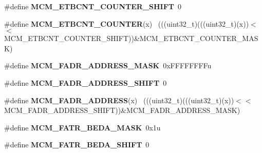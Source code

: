 \begin{DoxyCompactItemize}
\item 
\hypertarget{group___m_c_m___register___masks_ga6f3bfee5c1a266db914bfcce1b33e40f}{}\#define {\bfseries M\+C\+M\+\_\+\+E\+T\+B\+C\+N\+T\+\_\+\+C\+O\+U\+N\+T\+E\+R\+\_\+\+S\+H\+I\+F\+T}~0\label{group___m_c_m___register___masks_ga6f3bfee5c1a266db914bfcce1b33e40f}

\item 
\hypertarget{group___m_c_m___register___masks_ga39cc90d272fd862daffa4e7dd56ea620}{}\#define {\bfseries M\+C\+M\+\_\+\+E\+T\+B\+C\+N\+T\+\_\+\+C\+O\+U\+N\+T\+E\+R}(x)                                    ~(((uint32\+\_\+t)(((uint32\+\_\+t)(x))$<$$<$M\+C\+M\+\_\+\+E\+T\+B\+C\+N\+T\+\_\+\+C\+O\+U\+N\+T\+E\+R\+\_\+\+S\+H\+I\+F\+T))\&M\+C\+M\+\_\+\+E\+T\+B\+C\+N\+T\+\_\+\+C\+O\+U\+N\+T\+E\+R\+\_\+\+M\+A\+S\+K)\label{group___m_c_m___register___masks_ga39cc90d272fd862daffa4e7dd56ea620}

\item 
\hypertarget{group___m_c_m___register___masks_ga4d38b5dbbcf334e28e2c3201c8e658e2}{}\#define {\bfseries M\+C\+M\+\_\+\+F\+A\+D\+R\+\_\+\+A\+D\+D\+R\+E\+S\+S\+\_\+\+M\+A\+S\+K}~0x\+F\+F\+F\+F\+F\+F\+F\+Fu\label{group___m_c_m___register___masks_ga4d38b5dbbcf334e28e2c3201c8e658e2}

\item 
\hypertarget{group___m_c_m___register___masks_ga2c28100f868982fa4c5f783b8031664b}{}\#define {\bfseries M\+C\+M\+\_\+\+F\+A\+D\+R\+\_\+\+A\+D\+D\+R\+E\+S\+S\+\_\+\+S\+H\+I\+F\+T}~0\label{group___m_c_m___register___masks_ga2c28100f868982fa4c5f783b8031664b}

\item 
\hypertarget{group___m_c_m___register___masks_gaf25e8d81d4a025faf9b89e76a310225a}{}\#define {\bfseries M\+C\+M\+\_\+\+F\+A\+D\+R\+\_\+\+A\+D\+D\+R\+E\+S\+S}(x)                                        ~(((uint32\+\_\+t)(((uint32\+\_\+t)(x))$<$$<$M\+C\+M\+\_\+\+F\+A\+D\+R\+\_\+\+A\+D\+D\+R\+E\+S\+S\+\_\+\+S\+H\+I\+F\+T))\&M\+C\+M\+\_\+\+F\+A\+D\+R\+\_\+\+A\+D\+D\+R\+E\+S\+S\+\_\+\+M\+A\+S\+K)\label{group___m_c_m___register___masks_gaf25e8d81d4a025faf9b89e76a310225a}

\item 
\hypertarget{group___m_c_m___register___masks_ga272bbb2c15046aad60249952d201ebfc}{}\#define {\bfseries M\+C\+M\+\_\+\+F\+A\+T\+R\+\_\+\+B\+E\+D\+A\+\_\+\+M\+A\+S\+K}~0x1u\label{group___m_c_m___register___masks_ga272bbb2c15046aad60249952d201ebfc}

\item 
\hypertarget{group___m_c_m___register___masks_gad38f046cfa0d191e78c93e11fdd38956}{}\#define {\bfseries M\+C\+M\+\_\+\+F\+A\+T\+R\+\_\+\+B\+E\+D\+A\+\_\+\+S\+H\+I\+F\+T}~0\label{group___m_c_m___register___masks_gad38f046cfa0d191e78c93e11fdd38956}


\end{DoxyCompactItemize}
